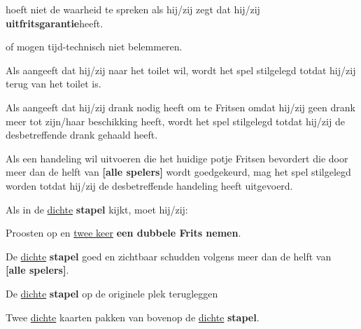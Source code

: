 \vervolgLijst{}
    \item \EenSpeler hoeft niet de waarheid te spreken als hij/zij zegt dat hij/zij \textbf{uitfritsgarantie}\footnotemark[2] heeft.
\eindLijst{}   

\vervolgLijst{}
    \item \Frits of \Willem mogen \medeSpelers tijd-technisch niet belemmeren. 
\eindLijst{}   


\newpage
{}


\vervolgLijst{}
    \item Als \eenSpeler aangeeft dat hij/zij naar het toilet wil, wordt het spel stilgelegd totdat hij/zij terug van het toilet is.
    \label{regel:stilleggen_1}
\eindLijst{}   

\vervolgLijst{}
    \item Als \eenSpeler aangeeft dat hij/zij drank nodig heeft om te Fritsen omdat hij/zij geen drank meer tot zijn/haar beschikking heeft, wordt het spel stilgelegd totdat hij/zij de desbetreffende drank gehaald heeft.
    \label{regel:stilleggen_2}
\eindLijst{}   

\vervolgLijst{}
    \item Als \eenSpeler een handeling wil uitvoeren die het huidige potje Fritsen bevordert die door meer dan de helft van \textbf{[alle spelers]} wordt goedgekeurd, mag het spel stilgelegd worden totdat hij/zij de desbetreffende handeling heeft uitgevoerd.
    \label{regel:stilleggen_3}
\eindLijst{}  


\vervolgLijst{}
    \item Als \eenSpeler in de \ul{dichte} \textbf{stapel} kijkt, moet hij/zij:
    \puntLijst{}
        \item Proosten op  en \ul{twee keer} \textbf{een dubbele Frits nemen}\footnotemark[2]. 
        \item De \ul{dichte} \textbf{stapel} goed en zichtbaar schudden volgens meer dan de helft van \\ \textbf{[alle spelers]}.
        \item De \ul{dichte} \textbf{stapel} op de originele plek terugleggen
        \item Twee \ul{dichte} kaarten pakken van bovenop de \ul{dichte} \textbf{stapel}.
    \eindPuntLijst{}
    \label{regel:kijken_in_dichte_stapel}
\eindLijst{}  

